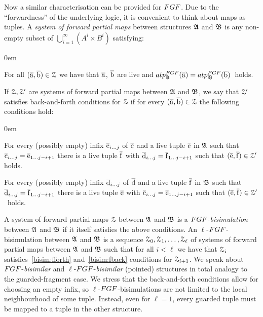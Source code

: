 \noindent
Now a similar characterisation can be provided for $\FGF$. 
Due to the ``forwardness'' of the underlying logic, it is convenient to think about maps as tuples.
A \emph{system of forward partial maps} between structures ${\mathfrak{A}}$ and ${\mathfrak{B}}$ is any non-empty subset of $\bigcup_{i=1}^{\infty} (A^i \times B^i)$ satisfying:
\begin{description}\itemsep0em
  \item[\desclabel{(AtomicEq)}{bisim:atomiceq}] For all $(\overline{\mathrm{a}}, \overline{\mathrm{b}}) \in \mathcal{Z}$ we have that $\overline{\mathrm{a}}$, $\overline{\mathrm{b}}$ are live and $\atp{\FGF}{\str{A}}{\elemtuplea} = \atp{\FGF}{\str{B}}{\elemtupleb}$~holds.
\end{description}
If $\mathcal{Z}, \mathcal{Z}'$ are systems of forward partial maps between ${\mathfrak{A}}$ and ${\mathfrak{B}}$, we say that $\mathcal{Z}'$ satisfies back-and-forth conditions for $\mathcal{Z}$ if for every $(\overline{\mathrm{a}}, \overline{\mathrm{b}}) \in \mathcal{Z}$ the following conditions hold:
\begin{description}\itemsep0em
  \item[\desclabel{(fForth)}{bisim:fforth}] For every (possibly empty) infix $\overline{\mathrm{c}}_{i\ldots j}$ of $\overline{\mathrm{c}}$ and a live tuple $\overline{\mathrm{e}}$ in ${\mathfrak{A}}$ such that $\overline{\mathrm{c}}_{i\ldots j} = \overline{\mathrm{e}}_{1\ldots j{-}i{+}1}$ there is a live tuple $\overline{\mathrm{f}}$ with $\overline{\mathrm{d}}_{i\ldots j} = {\overline{\mathrm{f}}}_{1\dots j{-}i{+}1}$ such that $(\overline{\mathrm{e}}, \overline{\mathrm{f}}) \in \mathcal{Z}'$ holds.
  \item[\desclabel{(fBack)}{bisim:fback}] For every (possibly empty) infix $\overline{\mathrm{d}}_{i\ldots j}$ of $\overline{\mathrm{d}}$ and a live tuple $\overline{\mathrm{f}}$ in ${\mathfrak{B}}$ such that $\overline{\mathrm{d}}_{i\ldots j} = {\overline{\mathrm{f}}}_{1\dots j{-}i{+}1}$ there is a live tuple $\overline{\mathrm{e}}$ with $\overline{\mathrm{c}}_{i\ldots j} = \overline{\mathrm{e}}_{1\ldots j{-}i{+}1}$ such that $(\overline{\mathrm{e}}, \overline{\mathrm{f}}) \in \mathcal{Z}'$~holds.
\end{description}
A system of forward partial maps $\mathcal{Z}$ between ${\mathfrak{A}}$ and ${\mathfrak{B}}$ is a $\FGF$-\emph{bisimulation} between ${\mathfrak{A}}$ and ${\mathfrak{B}}$ if it itself satisfies the above conditions.
An $\ell$-$\FGF$-bisimulation between ${\mathfrak{A}}$ and ${\mathfrak{B}}$ is a sequence $\mathcal{Z}_0, \mathcal{Z}_1, \ldots, \mathcal{Z}_\ell$ of systems of forward partial maps between ${\mathfrak{A}}$ and ${\mathfrak{B}}$ such that for all $i < \ell$ we have that $\mathcal{Z}_i$ satisfies~\ref{bisim:fforth} and~\ref{bisim:fback} conditions for $\mathcal{Z}_{i{+}1}$.
We speak about $\FGF$-\emph{bisimilar} and $\ell$-$\FGF$-\emph{bisimilar} (pointed) structures in total analogy to the guarded-fragment case.
We stress that the back-and-forth conditions allow for choosing an empty infix, so $\ell$-$\FGF$-bisimulations are not limited to the local neighbourhood of some tuple.
Instead, even for $\ell = 1$, every guarded tuple must be mapped to a tuple in the other structure.

